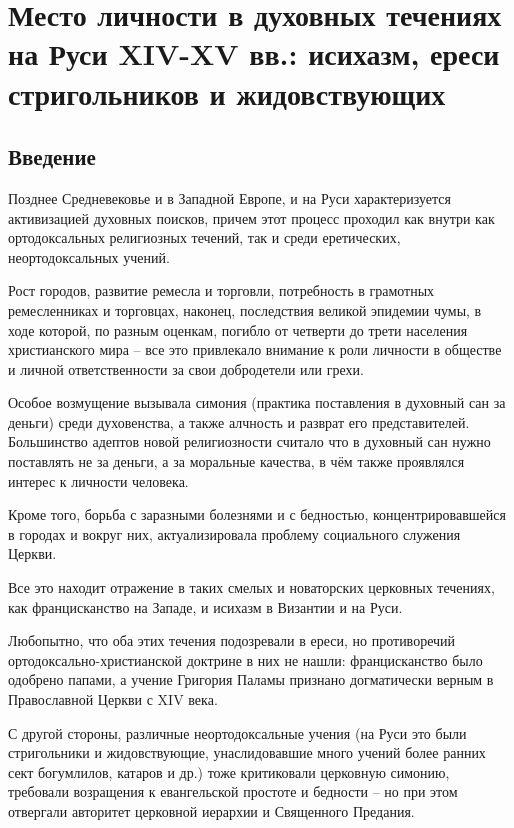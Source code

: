 \documentclass[12pt]{article}
\newcommand{\blue}[1]{\textcolor{blue}{#1}}
\begin{document}

  \setcounter{section}{4}
  \section{Место личности в духовных течениях на Руси XIV-XV вв.: исихазм, ереси стригольников и жидовствующих}

  \subsection{Введение}
  Позднее Средневековье и в Западной Европе, и на Руси характеризуется активизацией духовных поисков,
  причем этот процесс проходил как внутри как ортодоксальных религиозных течений, так и среди еретических,
  неортодоксальных учений.

  Рост городов, развитие ремесла и торговли, потребность в грамотных ремесленниках и торговцах, наконец,
  последствия великой эпидемии чумы, в ходе которой, по разным оценкам, погибло от четверти до трети населения христианского мира --
  все это привлекало внимание к роли личности в обществе и личной ответственности за свои добродетели или грехи.

  Особое возмущение вызывала симония (практика поставления в духовный сан за деньги) среди духовенства,
  а также алчность и разврат его представителей.
  Большинство адептов новой религиозности считало что в духовный сан нужно поставлять не за деньги,
  а за моральные качества, в чём также проявлялся интерес к личности человека.

  Кроме того, борьба с заразными болезнями и с бедностью, концентрировавшейся в городах и вокруг них,
  актуализировала проблему социального служения Церкви.

  Все это находит отражение в таких смелых и новаторских церковных течениях, как францисканство на Западе, и исихазм в Византии и на Руси.

  Любопытно, что оба этих течения подозревали в ереси, но противоречий ортодоксально-хри\-сти\-ан\-ской доктрине в них не нашли:
  францисканство было одобрено папами, а учение Григория Паламы признано догматически верным в Православной Церкви с XIV века.

  С другой стороны, различные неортодоксальные учения (на Руси это были стригольники и жидовствующие,
  унаслидовавшие много учений более ранних сект богумлилов, катаров и др.) тоже критиковали церковную симонию,
  требовали возращения к евангельской простоте и бедности --
  но при этом отвергали авторитет церковной иерархии и Священного Предания.
\end{document}
